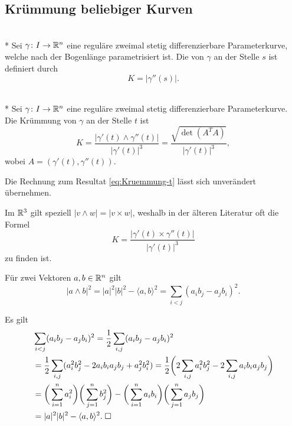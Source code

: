 \subsection{Krümmung beliebiger Kurven}

\begin{definition}\mbox{}\\*
Sei $\gamma\colon I\to \mathbb R^n$ eine reguläre zweimal stetig
differenzierbare Parameterkurve, welche nach der Bogenlänge
parametrisiert ist. Die  von $\gamma$ an der Stelle
$s$ ist definiert durch%
\begin{equation}
K = |\gamma''(s)|.
\end{equation}
\end{definition}

\begin{theorem}\mbox{}\\*
Sei $\gamma\colon I\to\mathbb R^n$ eine reguläre zweimal stetig
differenzierbare Parameterkurve. Die Krümmung von $\gamma$ an der
Stelle $t$ ist%
\begin{equation}
K = \frac{|\gamma'(t)\wedge\gamma''(t)|}{|\gamma'(t)|^3}
= \frac{\sqrt{\det(A^T A)}}{|\gamma'(t)|^3},
\end{equation}
wobei $A=(\gamma'(t),\gamma''(t))$.
\end{theorem}
 Die Rechnung zum Resultat \eqref{eq:Kruemmung-t}
lässt sich unverändert übernehmen.\;\qedsymbol

Im $\mathbb R^3$ gilt speziell $|v\wedge w| = |v\times w|$,
weshalb in der älteren Literatur oft die Formel%
\begin{equation}
K = \frac{|\gamma'(t)\times\gamma''(t)|}{|\gamma'(t)|^3}
\end{equation}
zu finden ist.

\begin{theorem}
Für zwei Vektoren $a,b\in\mathbb R^n$ gilt
\begin{equation}
|a\wedge b|^2 = |a|^2 |b|^2 - \langle a,b\rangle^2
= \sum_{i<j} (a_i b_j - a_j b_i)^2.
\end{equation}
\end{theorem}
Es gilt
\begin{align}
&\sum_{i<j} (a_i b_j - a_j b_i)^2
= \frac{1}{2}\sum_{i,j} (a_i b_j - a_j b_i)^2\\
&= \frac{1}{2}\sum_{i,j} (a_i^2 b_j^2 - 2a_i b_i a_j b_j + a_j^2 b_i^2)
= \frac{1}{2}\bigg(2\sum_{i,j} a_i^2 b_j^2 - 2\sum_{i,j}a_i b_i a_j b_j\bigg)\\
&= \bigg(\sum_{i=1}^n a_i^2\bigg)\bigg(\sum_{j=1}^n b_j^2\bigg)
- \bigg(\sum_{i=1}^n a_i b_i\bigg)\bigg(\sum_{j=1}^n a_j b_j\bigg)\\
&= |a|^2 |b|^2 - \langle a,b\rangle^2.\;\Box
\end{align}

